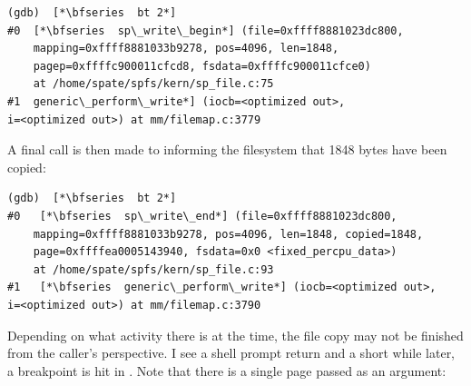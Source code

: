 \begin{lstlisting}
(gdb)  [*\bfseries  bt 2*]
#0  [*\bfseries  sp\_write\_begin*] (file=0xffff8881023dc800, 
    mapping=0xffff8881033b9278, pos=4096, len=1848, 
    pagep=0xffffc900011cfcd8, fsdata=0xffffc900011cfce0) 
    at /home/spate/spfs/kern/sp_file.c:75
#1  generic\_perform\_write*] (iocb=<optimized out>, 
i=<optimized out>) at mm/filemap.c:3779
\end{lstlisting}

\noindent
A final call is then made to  informing the filesystem that 1848 bytes have been copied:

\begin{lstlisting}
(gdb)  [*\bfseries  bt 2*]
#0   [*\bfseries  sp\_write\_end*] (file=0xffff8881023dc800, 
    mapping=0xffff8881033b9278, pos=4096, len=1848, copied=1848, 
    page=0xffffea0005143940, fsdata=0x0 <fixed_percpu_data>) 
    at /home/spate/spfs/kern/sp_file.c:93
#1   [*\bfseries  generic\_perform\_write*] (iocb=<optimized out>, 
i=<optimized out>) at mm/filemap.c:3790
\end{lstlisting}

\noindent
Depending on what activity there is at the time, the file copy may not be finished from the caller's perspective. I see a shell prompt return and a short while later, a breakpoint is hit in . Note that there is a single page passed as an argument:

